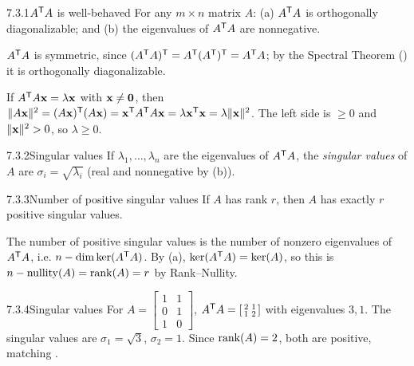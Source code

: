 \begin{thms}{7.3.1}{$A^{\mathsf{T}} A$ is well-behaved}
For any $m\times n$ matrix $A$:
\textup{(a)} $A^{\mathsf{T}} A$ is orthogonally diagonalizable; and
\textup{(b)} the eigenvalues of $A^{\mathsf{T}} A$ are nonnegative.
\end{thms}

\begin{prf}
 $A^{\mathsf{T}} A$ is symmetric, since $(A^{\mathsf{T}} A)^{\mathsf{T}}=A^{\mathsf{T}}(A^{\mathsf{T}})^{\mathsf{T}}=A^{\mathsf{T}} A$; by the Spectral Theorem () it is orthogonally diagonalizable.

 If $A^{\mathsf{T}} A\mathbf{x}=\lambda\mathbf{x}$ with $\mathbf{x}\neq\mathbf{0}$, then $\lVert A\mathbf{x} \rVert^2=(A\mathbf{x})^{\mathsf{T}}(A\mathbf{x})=\mathbf{x}^{\mathsf{T}} A^{\mathsf{T}} A\mathbf{x}=\lambda\mathbf{x}^{\mathsf{T}}\mathbf{x}=\lambda\lVert \mathbf{x} \rVert^2$. The left side is $\ge0$ and $\lVert \mathbf{x} \rVert^2>0$, so $\lambda\ge0$.
\end{prf}

\begin{defns}{7.3.2}{Singular values}
If $\lambda_1,\dots,\lambda_n$ are the eigenvalues of $A^{\mathsf{T}} A$, the \emph{singular values} of $A$ are $\sigma_i=\sqrt{\lambda_i}$ (real and nonnegative by (b)).
\end{defns}

\begin{thms}{7.3.3}{Number of positive singular values}
If $A$ has rank $r$, then $A$ has exactly $r$ positive singular values.
\end{thms}

\begin{prf}
The number of positive singular values is the number of nonzero eigenvalues of $A^{\mathsf{T}} A$, i.e. $n-\operatorname{dim}\ker(A^{\mathsf{T}} A)$. By (a), $\ker(A^{\mathsf{T}} A)=\ker(A)$, so this is $n-\operatorname{nullity}(A)=\operatorname{rank}(A)=r$ by Rank--Nullity.
\end{prf}

\begin{exmp}{7.3.4}{Singular values}
For $A=\left[\begin{smallmatrix}1&1\\0&1\\1&0\end{smallmatrix}\right]$, $A^{\mathsf{T}} A=\left[\begin{smallmatrix}2&1\\1&2\end{smallmatrix}\right]$ with eigenvalues $3,1$. The singular values are $\sigma_1=\sqrt3$, $\sigma_2=1$. Since $\operatorname{rank}(A)=2$, both are positive, matching .
\end{exmp}

